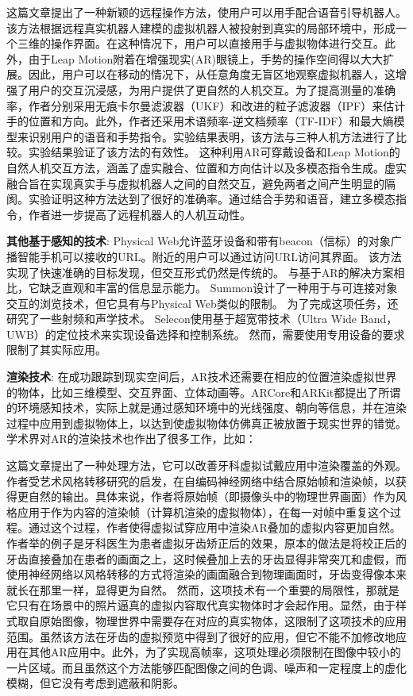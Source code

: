 这篇文章\cite{DuZhaLi19}提出了一种新颖的远程操作方法，使用户可以用手配合语音引导机器人。该方法根据远程真实机器人建模的虚拟机器人被投射到真实的局部环境中，形成一个三维的操作界面。在这种情况下，用户可以直接用手与虚拟物体进行交互。此外，由于Leap Motion附着在增强现实(AR)眼镜上，手势的操作空间得以大大扩展。因此，用户可以在移动的情况下，从任意角度无盲区地观察虚拟机器人，这增强了用户的交互沉浸感，为用户提供了更自然的人机交互。为了提高测量的准确率，作者分别采用无痕卡尔曼滤波器（UKF）和改进的粒子滤波器（IPF）来估计手的位置和方向。此外，作者还采用术语频率-逆文档频率（TF-IDF）和最大熵模型来识别用户的语音和手势指令。实验结果表明，该方法与三种人机方法进行了比较。实验结果验证了该方法的有效性。
这种利用AR可穿戴设备和Leap Motion的自然人机交互方法，涵盖了虚实融合、位置和方向估计以及多模态指令生成。虚实融合旨在实现真实手与虚拟机器人之间的自然交互，避免两者之间产生明显的隔阂。实验证明这种方法达到了很好的准确率。通过结合手势和语音，建立多模态指令，作者进一步提高了远程机器人的人机互动性。


\textbf{其他基于感知的技术}: 
Physical Web\cite{jenson2014physical}允许蓝牙设备和带有beacon（信标）的对象广播智能手机可以接收的URL。附近的用户可以通过访问URL访问其界面。
该方法实现了快速准确的目标发现，但交互形式仍然是传统的。
与基于AR的解决方案相比，它缺乏直观和丰富的信息显示能力。
Summon\cite{zachariah2020browsing}设计了一种用于与可连接对象交互的浏览技术，但它具有与Physical Web类似的限制。
为了完成这项任务，还研究了一些射频和声学技术\cite{alanwar2017selecon,pu2013whole,mao2016cat}。
Selecon\cite{alanwar2017selecon}使用基于超宽带技术（Ultra Wide Band，UWB）的定位技术来实现设备选择和控制系统。
然而，需要使用专用设备的要求限制了其实际应用。

\textbf{渲染技术}: 
在成功跟踪到现实空间后，AR技术还需要在相应的位置渲染虚拟世界的物体，比如三维模型、交互界面、立体动画等。ARCore和ARKit都提出了所谓的环境感知技术，实际上就是通过感知环境中的光线强度、朝向等信息，并在渲染过程中应用到虚拟物体上，以达到使虚拟物体仿佛真正被放置于现实世界的错觉。学术界对AR的渲染技术也作出了很多工作，比如：

这篇文章\cite{VasSor19}提出了一种处理方法，它可以改善牙科虚拟试戴应用中渲染覆盖的外观。作者受艺术风格转移研究的启发，在自编码神经网络中结合原始帧和渲染帧，以获得更自然的输出。具体来说，作者将原始帧（即摄像头中的物理世界画面）作为风格应用于作为内容的渲染帧（计算机渲染的虚拟物体），在每一对帧中重复这个过程。通过这个过程，作者使得虚拟试穿应用中渲染AR叠加的虚拟内容更加自然。作者举的例子是牙科医生为患者虚拟牙齿矫正后的效果，原本的做法是将校正后的牙齿直接叠加在患者的画面之上，这时候叠加上去的牙齿显得非常突兀和虚假，而使用神经网络以风格转移的方式将渲染的画面融合到物理画面时，牙齿变得像本来就长在那里一样，显得更为自然。
然而，这项技术有一个重要的局限性，那就是它只有在场景中的照片逼真的虚拟内容取代真实物体时才会起作用。显然，由于样式取自原始图像，物理世界中需要存在对应的真实物体，这限制了这项技术的应用范围。虽然该方法在牙齿的虚拟预览中得到了很好的应用，但它不能不加修改地应用在其他AR应用中。此外，为了实现高帧率，这项处理必须限制在图像中较小的一片区域。而且虽然这个方法能够匹配图像之间的色调、噪声和一定程度上的虚化模糊，但它没有考虑到遮蔽和阴影。

